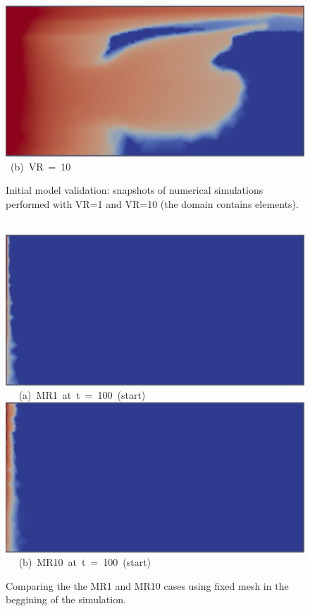 \begin{landscape}
\begin{figure}[ht]
{{            \includegraphics[width=.55\textwidth]{./Pics1/mr10_fixed/mr10_fixed_middle_1.pdf} }
      \hbox{\hspace{10cm} (b) VR = 10  }}
\caption{Initial model validation: snapshots of numerical simulations performed with VR=1 and VR=10 (the domain contains  elements). }
\label{fem_cv_represent_a}
\end{figure}
\end{landscape}
\clearpage



\begin{figure}[ht] 
\vbox{
\hbox{\hspace{1.5cm}
\includegraphics[width=.85\textwidth]{./Pics1/mr1_fixed/mr1_fixed_100_2.pdf} 
}
\vspace{0.0cm}
\hbox{\hspace{4.0cm} (a) MR1 at t = 100 (start)   
}
\vspace{0.25cm}
\hbox{\hspace{1.5cm}
\includegraphics[width=.85\textwidth]{./Pics1/mr10_fixed/mr10_fixed_100_1.pdf}
}
\vspace{0.0cm}
\hbox{\hspace{4.0cm} (b) MR10 at t = 100 (start)  
}
}     
\caption{Comparing the the MR1 and MR10 cases using fixed mesh in the beggining of the simulation.}
\label{fig:6a}
\end{figure}
\clearpage

